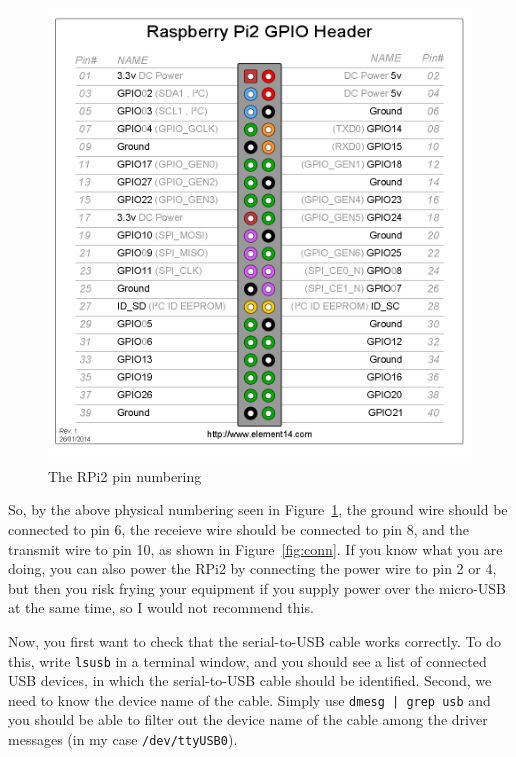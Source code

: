 \documentclass[a4paper,11pt,reqno]{amsart}
\begin{document}
\begin{figure}[hb]
\begin{center}
   \includegraphics[scale=0.3]{GPIO_Pi2.png}
 \end{center}
 \caption{The RPi2 pin numbering}
 \label{fig:pins}
\end{figure}

So, by the above physical numbering seen in Figure~\ref{fig:pins}, the ground wire should be connected to pin 6, the receieve wire should be connected to pin 8, and the transmit wire to pin 10, as shown in Figure~\ref{fig:conn}. If you know what you are doing, you can also power the RPi2 by connecting the power wire to pin 2 or 4, but then you risk frying your equipment if you supply power over the micro-USB at the same time, so I would not recommend this.

Now, you first want to check that the serial-to-USB cable works correctly. To do this, write \texttt{lsusb} in a terminal window, and you should see a list of connected USB devices, in which the serial-to-USB cable should be identified. Second, we need to know the device name of the cable. Simply use \texttt{dmesg | grep usb} and you should be able to filter out the device name of the cable among the driver messages (in my case \texttt{/dev/ttyUSB0}).
\end{document}
